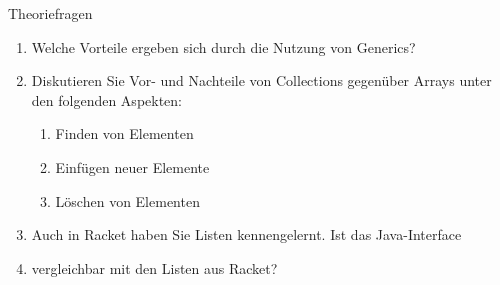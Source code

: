 \documentclass{../tuda-exercise}
\begin{document}
  \maketitle

  \begin{task}[credit=\stars{0}{3}]{Theoriefragen}
    \begin{enumerate}
      \item Welche Vorteile ergeben sich durch die Nutzung von Generics?
      \item Diskutieren Sie Vor- und Nachteile von Collections gegenüber Arrays unter den
      folgenden Aspekten:
      \begin{enumerate}
        [label=(\alph*)]
        \item Finden von Elementen
        \item Einfügen neuer Elemente
        \item Löschen von Elementen
      \end{enumerate}
      \item Auch in Racket haben Sie Listen kennengelernt. Ist das Java-Interface
      \item \href{https://docs.oracle.com/en/java/javase/11/docs/api/java.base/java/util/List.html}
      {} vergleichbar mit den Listen aus Racket?
    \end{enumerate}


\end{task}
\end{document}
